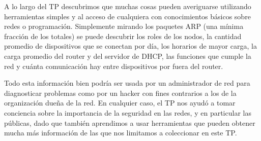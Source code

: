 A lo largo del TP descubrimos que muchas cosas pueden averiguarse utilizando
herramientas simples y al acceso de cualquiera con conocimientos básicos sobre
redes o programación. Simplemente mirando los paquetes ARP (una mínima fracción
de los totales) se puede descubrir los roles de los nodos, la cantidad promedio
de dispositivos que se conectan por día, los horarios de mayor carga, la carga
promedio del router y del servidor de DHCP, las funciones que cumple la red y
cuánta comunicación hay entre dispositivos por fuera del router.

Todo esta información bien podría ser usada por un administrador de red para
diagnosticar problemas como por un hacker con fines contrarios a los
de la organización dueña de la red. En cualquier caso, el TP nos ayudó a tomar
conciencia sobre la importancia de la seguridad en las redes, y en particular
las públicas, dado que también aprendimos a usar herramientas que pueden obtener
mucha más información de las que nos limitamos a coleccionar en este TP.